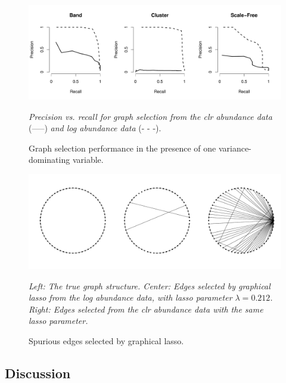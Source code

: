 \documentclass[10pt]{article}
\begin{document}
\begin{figure}
\caption{Graph selection performance in the presence of one variance-dominating variable.}
\label{f:prcurves}
\begin{center}
\includegraphics[width=6.5in]{figs/var-dom-pr.pdf}
\begin{small}
\textit{Precision vs. recall for graph selection from the clr abundance data} (-----) \textit{and log abundance data} (- - -).
\end{small}
\end{center}
\end{figure}

\begin{figure}
\caption{Spurious edges selected by graphical lasso.}
\label{f:spurious}
\begin{center}
\includegraphics[width=6.5in]{figs/var-dom-band.pdf}
\begin{small}
\textit{Left: The true graph structure. Center: Edges selected by graphical lasso from the log abundance data, with lasso parameter $\lambda = 0.212$. Right: Edges selected from the clr abundance data with the same lasso parameter.}
\end{small}
\end{center}
\end{figure}

\subsection*{Discussion}
\end{document}
